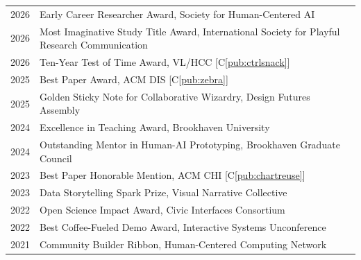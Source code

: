 %
%
%

\begin{longtable}{@{}ll}
  2026 & Early Career Researcher Award, Society for Human-Centered AI \\
  2026 & Most Imaginative Study Title Award, International Society for Playful Research Communication \\
  2026 & Ten-Year Test of Time Award, VL/HCC [C\ref{pub:ctrlsnack}]\\
  2025 & Best Paper Award, ACM DIS [C\ref{pub:zebra}] \\
  2025 & Golden Sticky Note for Collaborative Wizardry, Design Futures Assembly \\
  2024 & Excellence in Teaching Award, Brookhaven University \\
  2024 & Outstanding Mentor in Human-AI Prototyping, Brookhaven Graduate Council \\
  2023 & Best Paper Honorable Mention, ACM CHI [C\ref{pub:chartreuse}]\\
  2023 & Data Storytelling Spark Prize, Visual Narrative Collective \\
  2022 & Open Science Impact Award, Civic Interfaces Consortium \\
  2022 & Best Coffee-Fueled Demo Award, Interactive Systems Unconference \\
  2021 & Community Builder Ribbon, Human-Centered Computing Network\\
\end{longtable}

